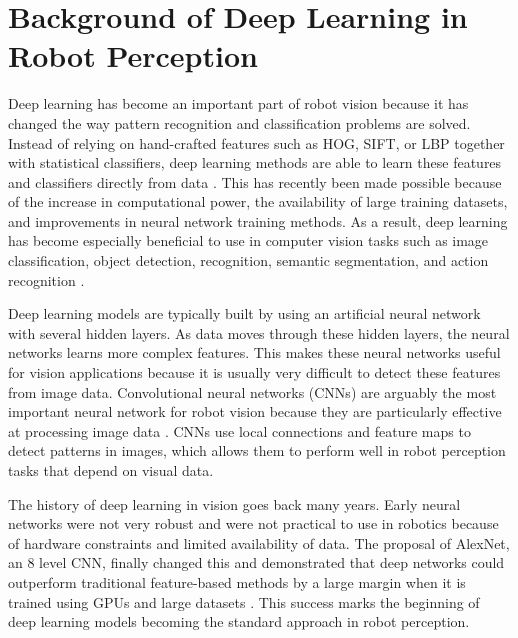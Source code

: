 \documentclass[conference]{IEEEtran}
\begin{document}
\section{Background of Deep Learning in Robot Perception}
Deep learning has become an important part of robot vision because it has changed the way pattern recognition and classification problems are solved. Instead of relying on hand-crafted features such as HOG, SIFT, or LBP together with statistical classifiers, deep learning methods are able to learn these features and classifiers directly from data \cite{ruiz2018}. This has recently been made possible because of the increase in computational power, the availability of large training datasets, and improvements in neural network training methods. As a result, deep learning has become especially beneficial to use in computer vision tasks such as image classification, object detection, recognition, semantic segmentation, and action recognition \cite{ruiz2018}.
\par
Deep learning models are typically built by using an artificial neural network with several hidden layers. As data moves through these hidden layers, the neural networks learns more complex features. This makes these neural networks useful for vision applications because it is usually very difficult to detect these features from image data. Convolutional neural networks (CNNs) are arguably the most important neural network for robot vision because they are particularly effective at processing image data \cite{ruiz2018}. CNNs use local connections and feature maps to detect patterns in images, which allows them to perform well in robot perception tasks that depend on visual data.
\par
The history of deep learning in vision goes back many years. Early neural networks were not very robust and were not practical to use in robotics because of hardware constraints and limited availability of data. The proposal of AlexNet, an 8 level CNN, finally changed this and demonstrated that deep networks could outperform traditional feature-based methods by a large margin when it is trained using GPUs and large datasets \cite{ruiz2018}. This success marks the beginning of deep learning models becoming the standard approach in robot perception.
\end{document}

